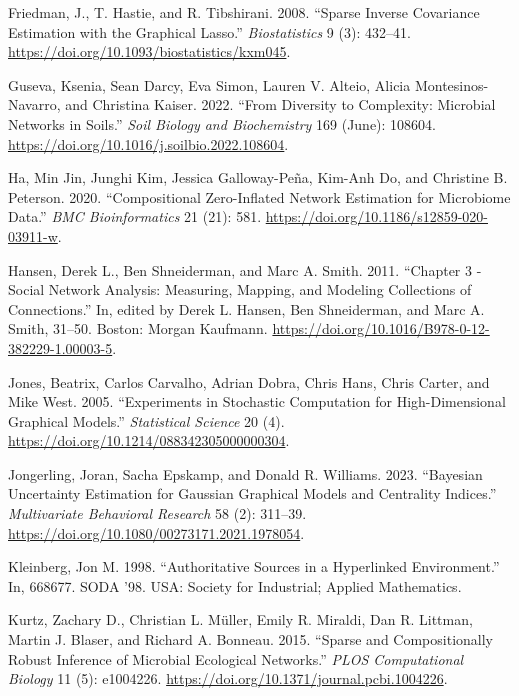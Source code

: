 \documentclass[
]{article}
\newlength{\cslhangindent}
\newlength{\cslentryspacingunit} %
\newenvironment{CSLReferences}[2] %
 {%
  \setlength{\parindent}{0pt}
  \ifodd #1
  \let\oldpar\par
  \def\par{\hangindent=\cslhangindent\oldpar}
  \fi
  \setlength{\parskip}{#2\cslentryspacingunit}
 }%
 {}
\begin{document}
\begin{CSLReferences}{1}{0}
\leavevmode{}%
Friedman, J., T. Hastie, and R. Tibshirani. 2008. {``Sparse Inverse
Covariance Estimation with the Graphical Lasso.''} \emph{Biostatistics}
9 (3): 432--41. \url{https://doi.org/10.1093/biostatistics/kxm045}.

\leavevmode{}%
Guseva, Ksenia, Sean Darcy, Eva Simon, Lauren V. Alteio, Alicia
Montesinos-Navarro, and Christina Kaiser. 2022. {``From Diversity to
Complexity: Microbial Networks in Soils.''} \emph{Soil Biology and
Biochemistry} 169 (June): 108604.
\url{https://doi.org/10.1016/j.soilbio.2022.108604}.

\leavevmode{}%
Ha, Min Jin, Junghi Kim, Jessica Galloway-Peña, Kim-Anh Do, and
Christine B. Peterson. 2020. {``Compositional Zero-Inflated Network
Estimation for Microbiome Data.''} \emph{BMC Bioinformatics} 21 (21):
581. \url{https://doi.org/10.1186/s12859-020-03911-w}.

\leavevmode{}%
Hansen, Derek L., Ben Shneiderman, and Marc A. Smith. 2011. {``Chapter 3
- Social Network Analysis: Measuring, Mapping, and Modeling Collections
of Connections.''} In, edited by Derek L. Hansen, Ben Shneiderman, and
Marc A. Smith, 31--50. Boston: Morgan Kaufmann.
\url{https://doi.org/10.1016/B978-0-12-382229-1.00003-5}.

\leavevmode{}%
Jones, Beatrix, Carlos Carvalho, Adrian Dobra, Chris Hans, Chris Carter,
and Mike West. 2005. {``Experiments in Stochastic Computation for
High-Dimensional Graphical Models.''} \emph{Statistical Science} 20 (4).
\url{https://doi.org/10.1214/088342305000000304}.

\leavevmode{}%
Jongerling, Joran, Sacha Epskamp, and Donald R. Williams. 2023.
{``Bayesian Uncertainty Estimation for Gaussian Graphical Models and
Centrality Indices.''} \emph{Multivariate Behavioral Research} 58 (2):
311--39. \url{https://doi.org/10.1080/00273171.2021.1978054}.

\leavevmode{}%
Kleinberg, Jon M. 1998. {``Authoritative Sources in a Hyperlinked
Environment.''} In, 668677. SODA '98. USA: Society for Industrial;
Applied Mathematics.

\leavevmode{}%
Kurtz, Zachary D., Christian L. Müller, Emily R. Miraldi, Dan R.
Littman, Martin J. Blaser, and Richard A. Bonneau. 2015. {``Sparse and
Compositionally Robust Inference of Microbial Ecological Networks.''}
\emph{PLOS Computational Biology} 11 (5): e1004226.
\url{https://doi.org/10.1371/journal.pcbi.1004226}.


\end{CSLReferences}
\end{document}
